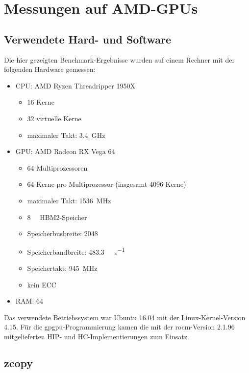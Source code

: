 \section{Messungen auf AMD-GPUs}
\label{amd}

\subsection{Verwendete Hard- und Software}

Die hier gezeigten Benchmark-Ergebnisse wurden auf einem Rechner mit der
folgenden Hardware gemessen:

\begin{itemize}
    \item CPU: AMD Ryzen Threadripper 1950X
          \begin{itemize}
              \item \num{16} Kerne
              \item \num{32} virtuelle Kerne
              \item maximaler Takt: \SI{3,4}{\giga\hertz}
          \end{itemize}
    \item GPU: AMD Radeon RX Vega 64
          \begin{itemize}
              \item \num{64} Multiprozessoren
              \item \num{64} Kerne pro Multiprozessor (insgesamt \num{4096}
                    Kerne)
              \item maximaler Takt: \SI{1536}{\mega\hertz}
              \item \SI{8}{\gibi\byte} HBM2-Speicher
              \item Speicherbusbreite: \SI{2048}{\bit}
              \item Speicherbandbreite: \SI{483,3}{\gibi\byte\per\second}
              \item Speichertakt: \SI{945}{\mega\hertz}
              \item kein ECC
          \end{itemize}
      \item RAM: \SI{64}{\gibi\byte}
\end{itemize}

Das verwendete Betriebssystem war Ubuntu 16.04 mit der Linux-Kernel-Version
4.15. Für die \gls{gpgpu}-Programmierung kamen die mit der \gls{rocm}-Version
2.1.96 mitgelieferten HIP- und HC-Implementierungen zum Einsatz.

\subsection{zcopy}

